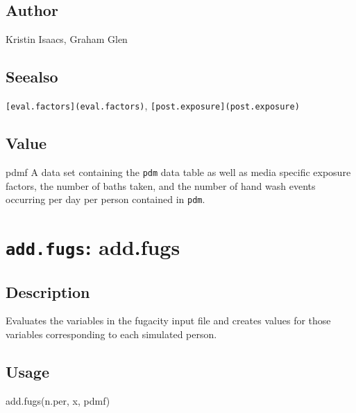 \documentclass[
]{article}
\newenvironment{Shaded}{\begin{snugshade}}{\end{snugshade}}
\newcommand{\FunctionTok}[1]{\textcolor[rgb]{0.00,0.00,0.00}{#1}}
\newcommand{\NormalTok}[1]{#1}
\begin{document}
\hypertarget{author-1}{%
\subsection{Author}\label{author-1}}

Kristin Isaacs, Graham Glen

\hypertarget{seealso-1}{%
\subsection{Seealso}\label{seealso-1}}

\texttt{{[}eval.factors{]}(eval.factors)},
\texttt{{[}post.exposure{]}(post.exposure)}

\hypertarget{value-1}{%
\subsection{Value}\label{value-1}}

pdmf A data set containing the \texttt{pdm} data table as well as media
specific exposure factors, the number of baths taken, and the number of
hand wash events occurring per day per person contained in \texttt{pdm}.

\hypertarget{add.fugs-add.fugs}{%
\section{\texorpdfstring{\texttt{add.fugs}:
add.fugs}{add.fugs: add.fugs}}\label{add.fugs-add.fugs}}

\hypertarget{description-3}{%
\subsection{Description}\label{description-3}}

Evaluates the variables in the fugacity input file and creates values
for those variables corresponding to each simulated person.

\hypertarget{usage-2}{%
\subsection{Usage}\label{usage-2}}

\begin{Shaded}
\begin{Highlighting}[]
\FunctionTok{add.fugs}\NormalTok{(n.per, x, pdmf)}
\end{Highlighting}
\end{Shaded}
\end{document}
